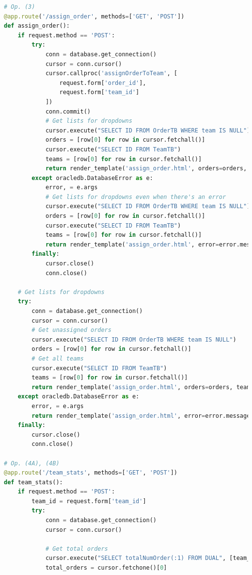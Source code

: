 \begin{lstlisting}[language=python]
# Op. (3)
@app.route('/assign_order', methods=['GET', 'POST'])
def assign_order():
    if request.method == 'POST':
        try:
            conn = database.get_connection()
            cursor = conn.cursor()
            cursor.callproc('assignOrderToTeam', [
                request.form['order_id'],
                request.form['team_id']
            ])
            conn.commit()
            # Get lists for dropdowns
            cursor.execute("SELECT ID FROM OrderTB WHERE team IS NULL")
            orders = [row[0] for row in cursor.fetchall()]
            cursor.execute("SELECT ID FROM TeamTB")
            teams = [row[0] for row in cursor.fetchall()]
            return render_template('assign_order.html', orders=orders, teams=teams, success="Order assigned successfully!")
        except oracledb.DatabaseError as e:
            error, = e.args
            # Get lists for dropdowns even when there's an error
            cursor.execute("SELECT ID FROM OrderTB WHERE team IS NULL")
            orders = [row[0] for row in cursor.fetchall()]
            cursor.execute("SELECT ID FROM TeamTB")
            teams = [row[0] for row in cursor.fetchall()]
            return render_template('assign_order.html', error=error.message, orders=orders, teams=teams)
        finally:
            cursor.close()
            conn.close()

    # Get lists for dropdowns
    try:
        conn = database.get_connection()
        cursor = conn.cursor()
        # Get unassigned orders
        cursor.execute("SELECT ID FROM OrderTB WHERE team IS NULL")
        orders = [row[0] for row in cursor.fetchall()]
        # Get all teams
        cursor.execute("SELECT ID FROM TeamTB")
        teams = [row[0] for row in cursor.fetchall()]
        return render_template('assign_order.html', orders=orders, teams=teams)
    except oracledb.DatabaseError as e:
        error, = e.args
        return render_template('assign_order.html', error=error.message)
    finally:
        cursor.close()
        conn.close()

# Op. (4A), (4B)
@app.route('/team_stats', methods=['GET', 'POST'])
def team_stats():
    if request.method == 'POST':
        team_id = request.form['team_id']
        try:
            conn = database.get_connection()
            cursor = conn.cursor()
            
            # Get total orders
            cursor.execute("SELECT totalNumOrder(:1) FROM DUAL", [team_id])
            total_orders = cursor.fetchone()[0]
            

\end{lstlisting}
